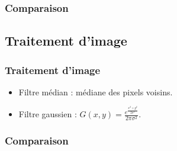 \documentclass[handout]{beamer}
\begin{document}
\begin{frame}
    \frametitle{Comparaison}
\end{frame}

\subsection{Traitement d'image}

\begin{frame}
    \frametitle{Traitement d'image}

    \begin{itemize}
        \item Filtre médian : médiane des pixels voisins.
        \item Filtre gaussien :
            $ G(x,y) = \frac{ e^{ \frac{x^2+y^2}{2 \sigma^2} } }{2 \pi \sigma^2} $.
    \end{itemize}

\end{frame}

\begin{frame}
    \frametitle{Comparaison}
\end{frame}
\end{document}
